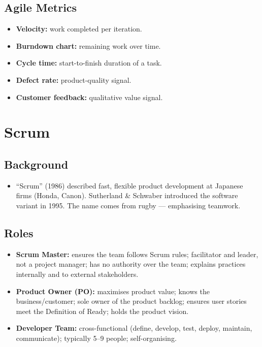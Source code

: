 \documentclass[hidelinks]{article}
\begin{document}
\subsection{Agile Metrics}
\begin{itemize}
  \item \textbf{Velocity:} work completed per iteration.
  \item \textbf{Burndown chart:} remaining work over time.
  \item \textbf{Cycle time:} start-to-finish duration of a task.
  \item \textbf{Defect rate:} product-quality signal.
  \item \textbf{Customer feedback:} qualitative value signal.
\end{itemize}

\section{Scrum}

\subsection{Background}
\begin{itemize}
  \item ``Scrum'' (1986) described fast, flexible product development at Japanese firms (Honda,
        Canon). Sutherland \& Schwaber introduced the software variant in 1995. The name comes from
        rugby --- emphasising teamwork.
\end{itemize}

\subsection{Roles}
\begin{itemize}
  \item \textbf{Scrum Master:} ensures the team follows Scrum rules; facilitator and leader, not a
        project manager; has no authority over the team; explains practices internally and to
        external stakeholders.
  \item \textbf{Product Owner (PO):} maximises product value; knows the business/customer; sole
        owner of the product backlog; ensures user stories meet the Definition of Ready; holds the
        product vision.
  \item \textbf{Developer Team:} cross-functional (define, develop, test, deploy, maintain,
        communicate); typically 5--9 people; self-organising.
\end{itemize}
\end{document}

